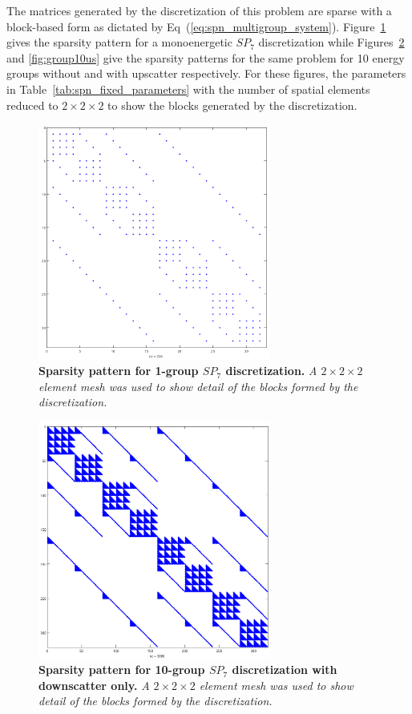 The matrices generated by the discretization of this problem are
sparse with a block-based form as dictated by
Eq~(\ref{eq:spn_multigroup_system}). Figure~\ref{fig:group1} gives the
sparsity pattern for a monoenergetic $SP_7$ discretization while
Figures~\ref{fig:group10ds} and \ref{fig:group10us} give the sparsity
patterns for the same problem for 10 energy groups without and with
upscatter respectively. For these figures, the parameters in
Table~\ref{tab:spn_fixed_parameters} with the number of spatial
elements reduced to $2 \times 2 \times 2$ to show the blocks generated
by the discretization.
\begin{figure}[t!]
  \begin{center}
    \includegraphics[width=3in]{chapters/spn_equations/group1.png}
  \end{center}
  \caption{\textbf{Sparsity pattern for 1-group $SP_7$
      discretization.} \textit{A $2\times 2 \times 2$ element mesh was
      used to show detail of the blocks formed by the discretization.}}
  \label{fig:group1}
\end{figure}
\begin{figure}[t!]
  \begin{center}
    \includegraphics[width=3in]{chapters/spn_equations/group10ds.png}
  \end{center}
  \caption{\textbf{Sparsity pattern for 10-group $SP_7$ discretization
      with downscatter only.} \textit{A $2\times 2 \times 2$ element
      mesh was used to show detail of the blocks formed by the
      discretization.}}
  \label{fig:group10ds}
\end{figure}
